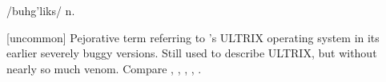  /buhg'liks/ n.

[uncommon] Pejorative term referring to 's ULTRIX operating
system in its earlier severely buggy versions. Still used to describe ULTRIX,
but without nearly so much venom. Compare , ,
, , .

